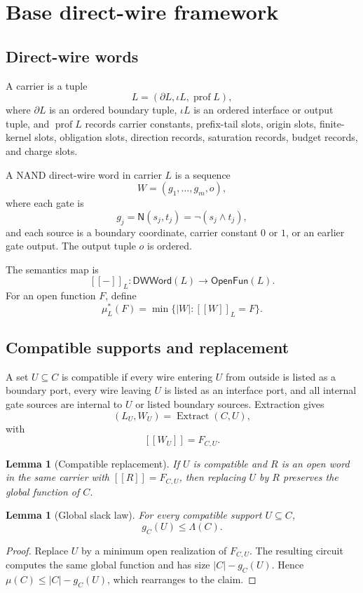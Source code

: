 \documentclass[10.5pt,a4paper]{article}
\newtheorem{lemma}[theorem]{Lemma}
\newcommand{\NAND}{\mathsf{N}}
\newcommand{\DWWord}{\mathsf{DWWord}}
\newcommand{\OpenFun}{\mathsf{OpenFun}}
\newcommand{\Extract}{\operatorname{Extract}}
\begin{document}
\section{Base direct-wire framework}

\subsection{Direct-wire words}
A carrier is a tuple
\[
L=(\partial L,\iota L,\operatorname{prof}L),
\]
where \(\partial L\) is an ordered boundary tuple, \(\iota L\) is an ordered interface or output tuple, and \(\operatorname{prof}L\) records carrier constants, prefix-tail slots, origin slots, finite-kernel slots, obligation slots, direction records, saturation records, budget records, and charge slots.

A NAND direct-wire word in carrier \(L\) is a sequence
\[
W=(g_1,\ldots,g_m,o),
\]
where each gate is
\[
g_j=\NAND(s_j,t_j)=\neg(s_j\wedge t_j),
\]
and each source is a boundary coordinate, carrier constant \(0\) or \(1\), or an earlier gate output. The output tuple \(o\) is ordered.

The semantics map is
\[
[[{-}]]_L:\DWWord(L)\to\OpenFun(L).
\]
For an open function \(F\), define
\[
\mu_L^*(F)=\min\{|W|:[[W]]_L=F\}.
\]

\subsection{Compatible supports and replacement}
A set \(U\subseteq C\) is compatible if every wire entering \(U\) from outside is listed as a boundary port, every wire leaving \(U\) is listed as an interface port, and all internal gate sources are internal to \(U\) or listed boundary sources. Extraction gives
\[
(L_U,W_U)=\Extract(C,U),
\]
with
\[
[[W_U]]=F_{C,U}.
\]

\begin{lemma}[Compatible replacement]
If \(U\) is compatible and \(R\) is an open word in the same carrier with \([[R]]=F_{C,U}\), then replacing \(U\) by \(R\) preserves the global function of \(C\).
\end{lemma}

\begin{lemma}[Global slack law]
For every compatible support \(U\subseteq C\),
\[
g_C(U)\le\Lambda(C).
\]
\end{lemma}
\begin{proof}
Replace \(U\) by a minimum open realization of \(F_{C,U}\). The resulting circuit computes the same global function and has size \(|C|-g_C(U)\). Hence \(\mu(C)\le |C|-g_C(U)\), which rearranges to the claim.
\end{proof}
\end{document}
